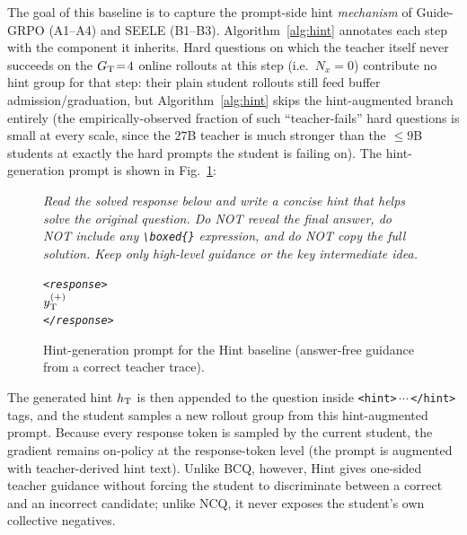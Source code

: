 \documentclass{llmxive}
\begin{document}
The goal of this baseline is to capture the prompt-side hint \emph{mechanism} of Guide-GRPO (A1--A4) and SEELE (B1--B3). Algorithm~\ref{alg:hint} annotates each step with the component it inherits. Hard questions on which the teacher itself never succeeds on the $G_{\rm T}\!=\!4$ online rollouts at this step (i.e.\ $N_x\!=\!0$) contribute no hint group for that step: their plain student rollouts still feed buffer admission/graduation, but Algorithm~\ref{alg:hint} skips the hint-augmented branch entirely (the empirically-observed fraction of such ``teacher-fails'' hard questions is small at every scale, since the $27$B teacher is much stronger than the $\leq\!9$B students at exactly the hard prompts the student is failing on). The hint-generation prompt is shown in Fig.~\ref{fig:prompt-hint}:
\begin{figure}[!htbp]
\begin{prompttemplatefig}
\small
\emph{Read the solved response below and write a concise hint that helps solve the original question. Do NOT reveal the final answer, do NOT include any \texttt{\textbackslash boxed\{\}} expression, and do NOT copy the full solution. Keep only high-level guidance or the key intermediate idea.}

\emph{\texttt{<response>}\\
$y_{\rm T}^{(+)}$\\
\texttt{</response>}}
\end{prompttemplatefig}
\caption{Hint-generation prompt for the Hint baseline (answer-free guidance from a correct teacher trace).}
\label{fig:prompt-hint}
\end{figure}
The generated hint $h_{\rm T}$ is then appended to the question inside \texttt{<hint>}\,$\cdots$\,\texttt{</hint>} tags, and the student samples a new rollout group from this hint-augmented prompt. Because every response token is sampled by the current student, the gradient remains on-policy at the response-token level (the prompt is augmented with teacher-derived hint text). Unlike BCQ, however, Hint gives one-sided teacher guidance without forcing the student to discriminate between a correct and an incorrect candidate; unlike NCQ, it never exposes the student's own collective negatives.
\end{document}
